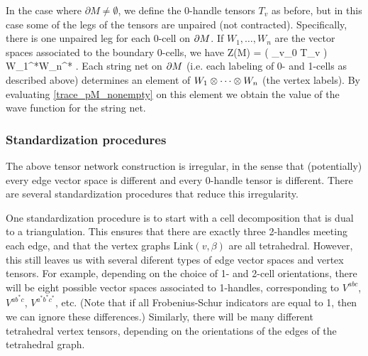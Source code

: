 In the case where $\partial M \neq \emptyset$, we define the 0-handle tensors $T_v$ as before,
but in this case some of the legs of the tensors are unpaired (not contracted).
Specifically, there is one unpaired leg for each 0-cell on $\partial M$.
If $W_1, \ldots, W_n$ are the vector spaces associated to the boundary 0-cells, we have
\be \label{trace_pM_nonempty}
	Z(M) = \tr \left( \bigotimes_{v\in \mch_0} T_v \right) \in W_1^*\tp\cdots\tp W_n^* .
\ee
Each string net on $\partial M$ (i.e. each labeling of 0- and 1-cells as described above)
determines an element of $W_1\otimes\cdots\otimes W_n$ (the vertex labels).
By evaluating \eqref{trace_pM_nonempty} on this element we obtain the value of the wave function for the string net.


\subsubsection{Standardization procedures}

The above tensor network construction is irregular, in the sense that (potentially) every edge vector space is different 
and every 0-handle tensor is different.
There are several standardization procedures that reduce this irregularity. 

One standardization procedure is to start with a cell decomposition that is dual to a triangulation.
This ensures that there are exactly three 2-handles meeting each edge, and that the vertex graphs $\text{Link}(v,\beta)$ are all tetrahedral.
However, this still leaves us with several diferent types of edge vector spaces and vertex tensors.
For example, depending on the choice of 1- and 2-cell orientations, there will be eight possible vector spaces associated to 1-handles,
corresponding to $V^{abc}$, $V^{ab^*c}$, $V^{a^*b^*c^*}$, etc.
(Note that if all Frobenius-Schur indicators are equal to 1, then we can ignore these differences.)
Similarly, there will be many different tetrahedral vertex tensors, depending on the orientations of the edges of the tetrahedral graph.

